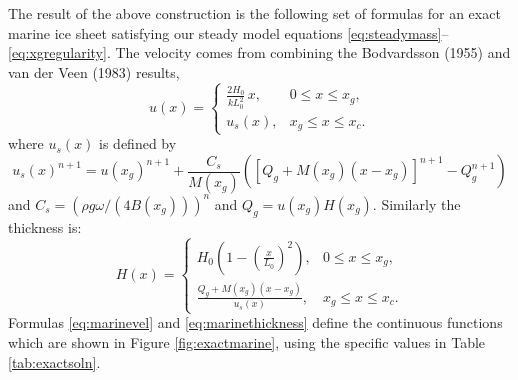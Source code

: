 \documentclass[review,letterpaper]{igs}
\begin{document}
The result of the above construction is the following set of formulas for an exact marine ice sheet satisfying our steady model equations \eqref{eq:steadymass}--\eqref{eq:xgregularity}.  The velocity comes from combining the Bodvardsson (1955) and van der Veen (1983) results,
\begin{equation}
u(x) = \begin{cases} \frac{2 H_0}{k L_0^2}\,x, & 0 \le x \le x_g, \\
                     u_s(x), & x_g \le x \le x_c.
       \end{cases} \label{eq:marinevel}
\end{equation}
where $u_s(x)$ is defined by
\begin{equation}
u_s(x)^{n+1} = u(x_g)^{n+1} + \frac{C_s}{M(x_g)} \left(\left[Q_g + M(x_g) (x-x_g)\right]^{n+1} - Q_g^{n+1}\right) \label{eq:vanderveenvel}
\end{equation}
and $C_s = \left(\rho g \omega/(4 B(x_g))\right)^n$ and $Q_g = u(x_g) H(x_g)$.  Similarly the thickness is:
\begin{equation}
H(x) = \begin{cases} H_0 \left(1 - (\frac{x}{L_0})^2\right), & 0 \le x \le x_g, \\
                     \frac{Q_g + M(x_g) (x-x_g)}{u_s(x)}, & x_g \le x \le x_c.
       \end{cases} \label{eq:marinethickness}
\end{equation}
Formulas \eqref{eq:marinevel} and \eqref{eq:marinethickness} define the continuous functions which are shown in Figure \ref{fig:exactmarine}, using the specific values in Table \ref{tab:exactsoln}.
\end{document}
